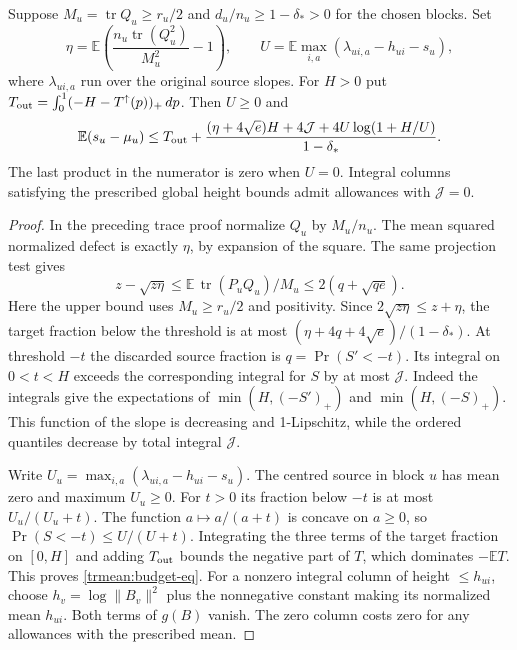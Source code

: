 \begin{corollary}\label{trmean:budget}
Suppose \(M_u=\operatorname{tr}Q_u\ge r_u/2\) and
\(d_u/n_u\ge1-\delta_*>0\) for the chosen blocks. Set
\[
 \eta=\mathbb E\left(\frac{n_u\operatorname{tr}(Q_u^2)}{M_u^2}-1\right),
 \qquad U=\mathbb E\max_{i,a}(\lambda_{ui,a}-h_{ui}-s_u),
\]
where \(\lambda_{ui,a}\) run over the original source slopes. For
\(H>0\) put \(T_{\rm out}=\int_0^1(-H-T^\uparrow(p))_+\,dp\).
Then \(U\ge0\) and
\begin{equation}\label{trmean:budget-eq}
 \mathbb E(s_u-\mu_u)\le T_{\rm out}+
 \frac{(\eta+4\sqrt e)H+4\mathcal J+4U\log(1+H/U)}{1-\delta_*}.
\end{equation}
The last product in the numerator is zero when \(U=0\). Integral
columns satisfying the prescribed global height bounds admit allowances
with \(\mathcal J=0\).
\end{corollary}
\begin{proof}
In the preceding trace proof normalize \(Q_u\) by \(M_u/n_u\). The
mean squared normalized defect is exactly \(\eta\), by expansion of
the square. The same projection test gives
\[
 z-\sqrt{z\eta}\le\mathbb E\,\operatorname{tr}(P_uQ_u)/M_u
                       \le 2(q+\sqrt{qe}).
\]
Here the upper bound uses \(M_u\ge r_u/2\) and positivity.
Since \(2\sqrt{z\eta}\le z+\eta\), the target fraction below the
threshold is at most \((\eta+4q+4\sqrt e)/(1-\delta_*)\).
At threshold \(-t\) the discarded source fraction is
\(q=\Pr(S'<-t)\). Its integral on \(0<t<H\) exceeds the corresponding
integral for \(S\) by at most \(\mathcal J\). Indeed the integrals
give the expectations of \(\min(H,(-S')_+)\) and \(\min(H,(-S)_+)\).
This function of the slope is decreasing and 1-Lipschitz, while the
ordered quantiles decrease by total integral \(\mathcal J\).

Write \(U_u=\max_{i,a}(\lambda_{ui,a}-h_{ui}-s_u)\). The centred
source in block \(u\) has mean zero and maximum \(U_u\ge0\).
For \(t>0\) its fraction below \(-t\) is at most \(U_u/(U_u+t)\).
The function \(a\mapsto a/(a+t)\) is concave on \(a\ge0\), so
\(\Pr(S<-t)\le U/(U+t)\). Integrating the three terms of the
target fraction on \([0,H]\) and adding \(T_{\rm out}\) bounds
the negative part of \(T\), which dominates \(-\mathbb E T\).
This proves \eqref{trmean:budget-eq}. For a nonzero integral column
of height \(\le h_{ui}\), choose \(h_v=\log\|B_v\|^2\) plus the
nonnegative constant making its normalized mean \(h_{ui}\).
Both terms of \(g(B)\) vanish. The zero column costs zero for any
allowances with the prescribed mean.
\end{proof}
